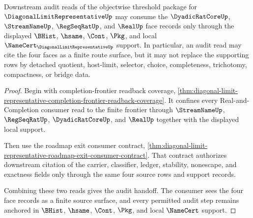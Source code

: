 \begin{theorem}
\label{thm:diagonal-limit-representative-objectwise-audit-threshold-handoff}
Downstream audit reads of the objectwise threshold package for $\DiagonalLimitRepresentativeUp$ may consume the $\DyadicRatCoreUp$, $\StreamNameUp$, $\RegSeqRatUp$, and $\RealUp$ face records only through the displayed $\BHist$, $\hsame$, $\Cont$, $\Pkg$, and local $\NameCert_{\DiagonalLimitRepresentativeUp}$ support. In particular, an audit read may cite the four faces as a finite route surface, but it may not replace the supporting rows by detached quotient, host-limit, selector, choice, completeness, trichotomy, compactness, or bridge data.
\end{theorem}
\begin{proof}
Begin with completion-frontier readback coverage, \autoref{thm:diagonal-limit-representative-completion-frontier-readback-coverage}. It confines every Real-and-Completion consumer read to the finite frontier through $\StreamNameUp$, $\RegSeqRatUp$, $\DyadicRatCoreUp$, and $\RealUp$ together with the displayed local support.

Then use the roadmap exit consumer contract, \autoref{thm:diagonal-limit-representative-roadmap-exit-consumer-contract}. That contract authorizes downstream citation of the carrier, classifier, ledger, stability, nonescape, and exactness fields only through the same four source rows and support records.

Combining these two reads gives the audit handoff. The consumer sees the four face records as a finite source surface, and every permitted audit step remains anchored in $\BHist$, $\hsame$, $\Cont$, $\Pkg$, and local $\NameCert$ support.
\end{proof}

